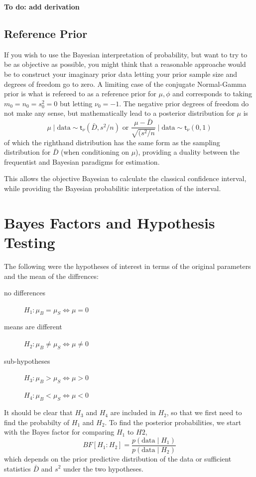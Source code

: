 \documentclass[11pt]{article}
\def\BF{\textit{BF}}
\newcommand{\St}{\textsf{t}}
\def\data{\text{data}}
\begin{document}
{\bf To do: add derivation}

\subsection*{Reference Prior}

If you wish to use the Bayesian interpretation of probability, but want to try to be as objective as possible, you might think that a reasonable approache would be to construct your imaginary prior data letting your prior sample size and degrees of freedom go to zero.  A limiting case of the conjugate Normal-Gamma prior is what is refereed to as a reference prior for $\mu, \phi$ and corresponds to taking $m_0 = n_0 = s^2_0 = 0$ but letting $\nu_0 = -1$.  The negative prior degrees of freedom do not make any sense, but mathematically lead to 
a posterior distribution for $\mu$ is 
$$
\mu \mid \data  \sim \St_{\nu}(\bar{D}, s^2/n)  \text{ or }  \frac{\mu - \bar{D}}{\sqrt{(s^2/n}}  \mid \data \sim \St_{\nu}(0,1)
$$
of which the righthand distribution has the same form as the sampling distribution  for $\bar{D}$ (when conditioning on $\mu$), providing a duality between the frequentist and Bayesian paradigms for estimation.

This allows the objective Bayesian to calculate the classical confidence interval, while providing the Bayesian probabilitic interpretation of the interval.

\section*{Bayes Factors and Hypothesis Testing}

The following were the hypotheses of interest in terms of the original parameters and the mean of the diffrences:
\begin{description}%
\item [no differences] $H_1:  \mu_B = \mu_S  \Leftrightarrow \mu = 0 $   
\item [means are different] $H_2:  \mu_B \neq \mu_S \Leftrightarrow \mu  \neq 0 $ 
\item [sub-hypotheses]  $H_{3}:  \mu_B > \mu_S \Leftrightarrow \mu  > 0 $ 
\item [ ] $H_{4}:  \mu_B < \mu_S \Leftrightarrow \mu  < 0 $
\end{description}

It should be clear that $H_3$ and $H_4$ are included in $H_2$, so that we first need to find the probabilty of $H_1$ and $H_2$.    To find the posterior probabilities, we start with the Bayes factor for comparing $H_1$  to $H2$,
$$
\BF[H_1: H_2] = \frac{p(\data \mid H_1)} {p(\data \mid H_2)}
$$
which depends on the prior predictive distribution of the data or sufficient statistics $\bar{D}$ and $s^2$ under the two hypotheses. 
\end{document}
